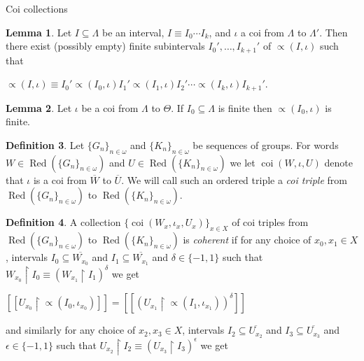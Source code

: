 \documentclass{amsart}
\theoremstyle{definition}\newtheorem{theorem}{Theorem}
\theoremstyle{definition}\newtheorem*{A}{Main Theorem}
\theoremstyle{definition}\newtheorem*{B}{Theorem \ref{elementaryequiv}}
\theoremstyle{definition}\newtheorem*{C}{Theorem \ref{continuous}}
\theoremstyle{definition}\newtheorem*{D}{Theorem \ref{bigisomorphism2}}
\theoremstyle{definition}\newtheorem{bigtheorem}{Main Theorem}
\numberwithin{theorem}{section}
\theoremstyle{definition}\newtheorem{corollary}[theorem]{Corollary}
\theoremstyle{definition}\newtheorem{proposition}[theorem]{Proposition}
\theoremstyle{definition}\newtheorem{definition}[theorem]{Definition}
\theoremstyle{definition}\newtheorem{question}[theorem]{Question}
\theoremstyle{definition}\newtheorem{example}[theorem]{Example}
\theoremstyle{definition}\newtheorem{remark}[theorem]{Remark}
\theoremstyle{definition}\newtheorem{note}[theorem]{Note}
\theoremstyle{definition}\newtheorem{lemma}[theorem]{Lemma}
\theoremstyle{definition}\newtheorem{fact}[theorem]{Fact}
\theoremstyle{definition}\newtheorem{define}[theorem]{Definition}
\theoremstyle{definition}\newtheorem{claim}[theorem]{Claim}
\theoremstyle{definition}\newtheorem{obs}[theorem]{Observation}
\theoremstyle{definition}\newtheorem{definitions}[theorem]{Definitions}
\newcommand{\Red}{\operatorname{Red}}
\newcommand{\coi}{\operatorname{coi}}
\begin{document}
\begin{section}{Coi collections}
\begin{lemma}\label{coilemma}  Let $I \subseteq \Lambda$ be an interval, $I \equiv I_0 \cdots I_k$, and $\iota$ a coi from $\Lambda$ to $\Lambda'$.  Then there exist (possibly empty) finite subintervals $I_0', \ldots, I_{k+1}'$ of $\varpropto(I, \iota)$ such that 

\begin{center}

$\varpropto(I, \iota) \equiv I_0'\varpropto(I_0, \iota) I_1' \varpropto(I_1, \iota) I_2' \cdots \varpropto(I_k, \iota) I_{k+1}'$.

\end{center}
\end{lemma}

\begin{lemma}\label{coilemma2}  Let $\iota$ be a coi from $\Lambda$ to $\Theta$.  If $I_0 \subseteq \Lambda$ is finite then $\varpropto(I_0, \iota)$ is finite.
\end{lemma}

\begin{definition}  Let $\{G_n\}_{n\in \omega}$ and $\{K_n\}_{n \in \omega}$ be sequences of groups.  For words $W \in \Red(\{G_n\}_{n\in \omega})$ and $U \in \Red(\{K_n\}_{n \in \omega})$ we let $\coi(W, \iota, U)$ denote that $\iota$ is a coi from $\overline{W}$ to $\overline{U}$.  We will call such an ordered triple a \emph{coi triple} from $\Red(\{G_n\}_{n\in \omega})$ to $\Red(\{K_n\}_{n \in \omega})$.
\end{definition}


\begin{definition}  A collection $\{\coi(W_x, \iota_x, U_x)\}_{x\in X}$ of coi triples from $\Red(\{G_n\}_{n\in \omega})$ to $\Red(\{K_n\}_{n \in \omega})$ is \emph{coherent} if for any choice of $x_0, x_1 \in X$, intervals $I_0 \subseteq \overline{W_{x_0}}$ and $I_1 \subseteq \overline{W_{x_1}}$ and $\delta \in \{-1, 1\}$ such that $W_{x_0} \upharpoonright I_0 \equiv (W_{x_1} \upharpoonright I_1)^{\delta}$ we get

\begin{center}

$[[U_{x_0} \upharpoonright \varpropto(I_0, \iota_{x_0})]] = [[(U_{x_1}\upharpoonright \varpropto(I_1, \iota_{x_1}))^{\delta}]]$

\end{center}
 
\noindent and similarly for any choice of $x_2, x_3 \in X$, intervals $I_2 \subseteq \overline{U_{x_2}}$ and $I_3 \subseteq \overline{U_{x_3}}$ and $\epsilon \in \{-1, 1\}$ such that $U_{x_2} \upharpoonright I_2 \equiv (U_{x_3} \upharpoonright I_3)^{\epsilon}$ we get


\end{definition}
\end{section}
\end{document}
